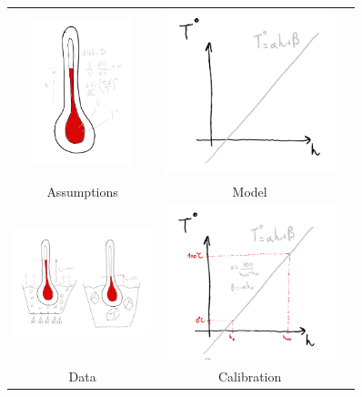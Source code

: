 \begin{bibunit}
\begin{figure}[h]
\centering
\begin{tabular}{ccc}

    \includegraphics[clip, width=3cm, width=3cm]{Introduction/pics/therm_theroy.png} &   \includegraphics[clip, width=5cm]{Introduction/pics/therm_model.png}  &   \\   Assumptions & Model&\\ 
     \includegraphics[clip, width=4cm, height=4cm, trim={2cm 1cm 2cm 2cm}]{Introduction/pics/therm_obs.png} &    \includegraphics[clip, width=5cm]{Introduction/pics/therm_calib.png}   &  \\    Data & Calibration&\\
\end{tabular}


\end{figure}
\end{bibunit}

